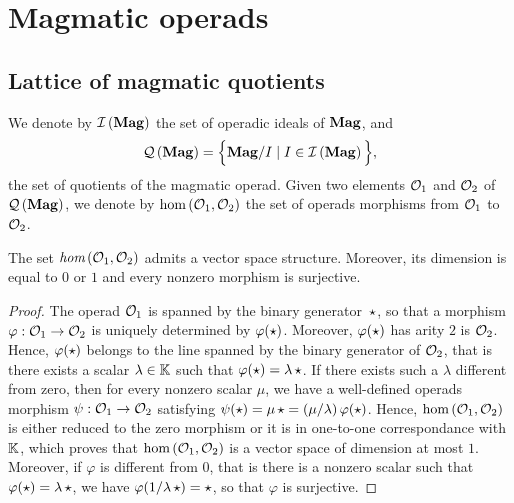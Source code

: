 
\section{Magmatic operads}
\label{sec:Magmatic_operads}


\subsection{Lattice of magmatic quotients}

We denote by $\mathcal{I}\left(\mathbf{Mag}\right)$ the set of operadic ideals of $\mathbf{Mag}$, and
\begin{equation} \label{equ:definition_of_QMag}
  \mathcal{Q}\left(\mathbf{Mag}\right) =\Big\{\mathbf{Mag}/ I\mid I\in\mathcal{I}\left(\mathbf{Mag}\right)\Big\},
  \end{equation}
the set of quotients of the magmatic operad. Given two elements $\mathcal{O}_1$
and $\mathcal{O}_2$ of $\mathcal{Q}\left(\mathbf{Mag}\right)$, we denote by $\text{hom}\left(\mathcal{O}_1,\mathcal{O}_2\right)$
the set of operads morphisms from $\mathcal{O}_1$ to $\mathcal{O}_2$.

\begin{Proposition} \label{prop:endomorphisms_of_magmatic_operads}
  The set $\emph{hom}\left(\mathcal{O}_1,\mathcal{O}_2\right)$ admits a vector space
  structure. Moreover, its dimension is equal to $0$ or $1$ and every
  nonzero morphism is surjective.
\end{Proposition}

\begin{proof}
  The operad $\mathcal{O}_1$ is spanned by the binary generator~$\operatorname{\star}$, so
  that a morphism $\varphi:\mathcal{O}_1\to\mathcal{O}_2$ is uniquely determined by
  $\varphi(\operatorname{\star})$. Moreover, $\varphi(\operatorname{\star})$ has arity $2$ is
  $\mathcal{O}_2$. Hence, $\varphi(\operatorname{\star})$ belongs to the line spanned by
  the binary generator of $\mathcal{O}_2$, that is there exists a scalar
  $\lambda\in\mathbb{K}$ such that $\varphi(\operatorname{\star})=\lambda\operatorname{\star}$. If there
  exists such a $\lambda$ different from zero, then for every nonzero
  scalar $\mu$, we have a well-defined operads morphism
  $\psi:\mathcal{O}_1\to\mathcal{O}_2$ satisfying $\psi(\operatorname{\star})=\mu\operatorname{\star}=\left(
  \mu/\lambda\right)\varphi(\operatorname{\star})$. Hence,
  $\text{hom}\left(\mathcal{O}_1,\mathcal{O}_2\right)$ is either reduced to the zero
  morphism or it is in one-to-one correspondance with $\mathbb{K}$, which
  proves that $\text{hom}\left(\mathcal{O}_1,\mathcal{O}_2\right)$ is a vector space
  of dimension at most $1$. Moreover, if $\varphi$ is different from $0$,
  that is there is a nonzero scalar such that
  $\varphi(\operatorname{\star})=\lambda\operatorname{\star}$, we have
  $\varphi(1/\lambda\operatorname{\star})=\operatorname{\star}$, so that $\varphi$ is
  surjective.
\end{proof}


